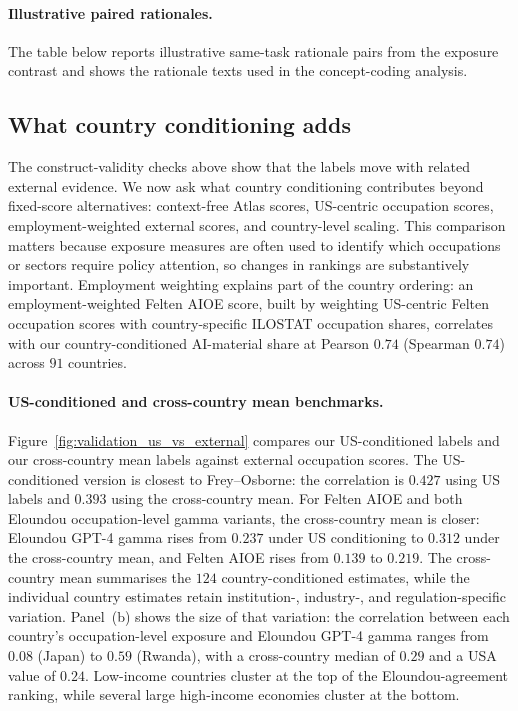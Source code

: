 \documentclass[11pt]{article}
\begin{document}
\paragraph{Illustrative paired rationales.}
The table below reports illustrative same-task rationale pairs from the exposure contrast and shows the rationale texts used in the concept-coding analysis.


\FloatBarrier
\subsection{What country conditioning adds}
\label{sec:validation_country_contribution}
The construct-validity checks above show that the labels move with related external evidence. We now ask what country conditioning contributes beyond fixed-score alternatives: context-free Atlas scores, US-centric occupation scores, employment-weighted external scores, and country-level scaling. This comparison matters because exposure measures are often used to identify which occupations or sectors require policy attention, so changes in rankings are substantively important. Employment weighting explains part of the country ordering: an employment-weighted Felten AIOE score, built by weighting US-centric Felten occupation scores with country-specific ILOSTAT occupation shares, correlates with our country-conditioned AI-material share at Pearson $0.74$ (Spearman $0.74$) across $91$ countries. %

\paragraph{US-conditioned and cross-country mean benchmarks.} Figure~\ref{fig:validation_us_vs_external} compares our US-conditioned labels and our cross-country mean labels against external occupation scores. The US-conditioned version is closest to Frey--Osborne: the correlation is $0.427$ using US labels and $0.393$ using the cross-country mean. For Felten AIOE and both Eloundou occupation-level gamma variants, the cross-country mean is closer: Eloundou GPT-4 gamma rises from $0.237$ under US conditioning to $0.312$ under the cross-country mean, and Felten AIOE rises from $0.139$ to $0.219$. The cross-country mean summarises the $124$ country-conditioned estimates, while the individual country estimates retain institution-, industry-, and regulation-specific variation. Panel~(b) shows the size of that variation: the correlation between each country's occupation-level exposure and Eloundou GPT-4 gamma ranges from $0.08$ (Japan) to $0.59$ (Rwanda), with a cross-country median of $0.29$ and a USA value of $0.24$. Low-income countries cluster at the top of the Eloundou-agreement ranking, while several large high-income economies cluster at the bottom.
\end{document}
